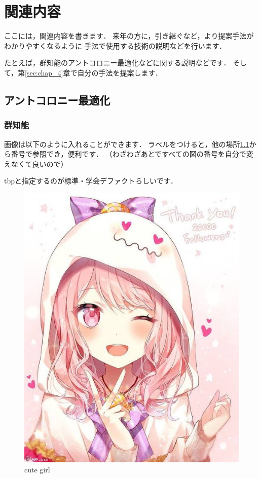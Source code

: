 \chapter{関連内容}

ここには，関連内容を書きます．
来年の方に，引き継ぐなど，より提案手法がわかりやすくなるように
手法で使用する技術の説明などを行います．

たとえば，群知能のアントコロニー最適化などに関する説明などです．
そして，第\ref{sec:chap_4}章で自分の手法を提案します．


\section{アントコロニー最適化}


\subsection{群知能}

画像は以下のように入れることができます．
ラベルをつけると，他の場所\ref{fig:cute}から番号で参照でき，便利です．
（わざわざあとですべての図の番号を自分で変えなくて良いので）

tbpと指定するのが標準・学会デファクトらしいです．

\begin{figure}[tbp]
    \begin{center}
        \includegraphics[width=0.8\linewidth]{images/chapter3/cute.jpeg}
    \end{center}
    \caption{cute girl}
    \label{fig:cute}
\end{figure}

